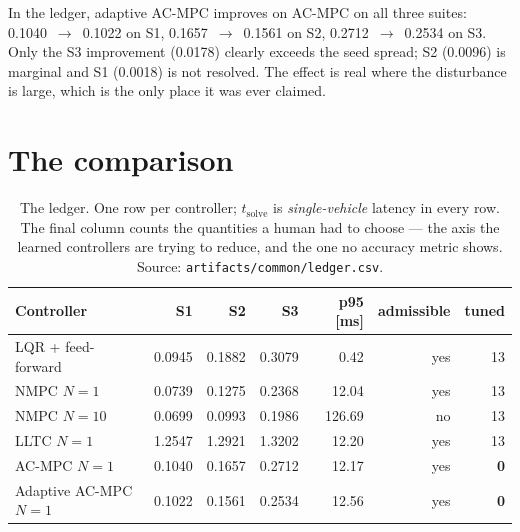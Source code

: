 \documentclass[11pt,a4paper,twoside,openright]{report}
\DeclareRobustCommand{\ACMPC}{AC\nbd MPC}
\DeclareRobustCommand{\LLTC}{LLTC}
\theoremstyle{plain}
\theoremstyle{definition}
\theoremstyle{remark}
\DeclareRobustCommand{\nbd}{\mbox{-}}
\begin{document}
	In the ledger, adaptive \ACMPC{} improves on \ACMPC{} on all three suites:
	\num{0.1040}~$\to$~\num{0.1022} on S1, \num{0.1657}~$\to$~\num{0.1561} on
	S2, \num{0.2712}~$\to$~\num{0.2534} on S3. Only the S3 improvement
	(\num{0.0178}) clearly exceeds the seed spread; S2 (\num{0.0096}) is
	marginal and S1 (\num{0.0018}) is not resolved. The effect is real where the
	disturbance is large, which is the only place it was ever claimed.

	\section{The comparison}
	\label{sec:res-comparison}

	\begin{table}[htbp]
		\centering
		\caption{The ledger. One row per controller; $t_\mathrm{solve}$ is
			\emph{single-vehicle} latency in every row. The final column counts the
			quantities a human had to choose --- the axis the learned controllers are
			trying to reduce, and the one no accuracy metric shows. Source:
			\texttt{artifacts/common/ledger.csv}.}
		\label{tab:ledger}
		\small
		\begin{tabularx}{\linewidth}{@{}X r r r r r r@{}}
			\toprule
			\textbf{Controller} & \textbf{S1} & \textbf{S2} & \textbf{S3} & \textbf{p95 [\si{\milli\second}]} & \textbf{admissible} & \textbf{tuned} \\
			\midrule
			LQR + feed-forward & 0.0945 & 0.1882 & 0.3079 & 0.42 & yes & 13 \\
			NMPC $N{=}1$ & 0.0739 & 0.1275 & 0.2368 & 12.04 & yes & 13 \\
			NMPC $N{=}10$ & 0.0699 & 0.0993 & 0.1986 & 126.69 & no & 13 \\
			\LLTC{} $N{=}1$ & 1.2547 & 1.2921 & 1.3202 & 12.20 & yes & 13 \\
			\ACMPC{} $N{=}1$ & 0.1040 & 0.1657 & 0.2712 & 12.17 & yes & \textbf{0} \\
			Adaptive \ACMPC{} $N{=}1$ & 0.1022 & 0.1561 & 0.2534 & 12.56 & yes & \textbf{0} \\
			\bottomrule
		\end{tabularx}
	\end{table}
\end{document}
